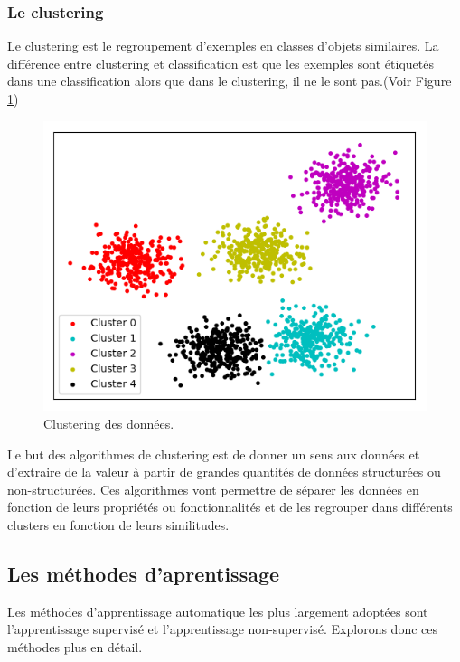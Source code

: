 \subsubsection{Le clustering}
Le clustering est le regroupement d'exemples en classes d'objets similaires.
La différence entre clustering et classification est que les exemples sont
étiquetés dans une classification alors que dans le clustering, il ne le sont
pas.(Voir Figure \ref{fig:clustering})


\begin{figure}[h!]
  \begin{center}
    \includegraphics[width=14cm]{images/clustering.png}
      \caption{Clustering des données.\label{fig:clustering}}
  \end{center}
\end{figure}

Le but des algorithmes de clustering est de donner un sens aux données et
d'extraire de la valeur à partir de grandes quantités de données structurées ou
non-structurées. Ces algorithmes vont permettre de séparer les données en
fonction de leurs propriétés ou fonctionnalités et de les regrouper dans
différents clusters en fonction de leurs similitudes.




\subsection{Les méthodes d'aprentissage}
Les méthodes d'apprentissage automatique les
plus largement adoptées sont l'apprentissage supervisé et l'apprentissage
non-supervisé. Explorons donc ces méthodes plus en détail.

